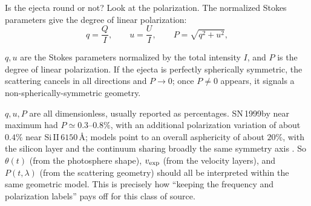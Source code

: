 Is the ejecta round or not? Look at the polarization. The normalized Stokes parameters give the degree of linear polarization:
\begin{equation}
  q=\frac{Q}{I},\qquad
  u=\frac{U}{I},\qquad
  P=\sqrt{q^2+u^2},
  \label{eq:e20-stokes-polarization}
\end{equation}
\begin{formulaexplain}
\(q,u\) are the Stokes parameters normalized by the total intensity \(I\), and \(P\) is the degree of linear polarization. If the ejecta is perfectly spherically symmetric, the scattering cancels in all directions and \(P\to0\); once \(P\neq0\) appears, it signals a non-spherically-symmetric geometry.
\end{formulaexplain}
\(q,u,P\) are all dimensionless, usually reported as percentages. SN\,1999by near maximum had \(P\simeq0.3\text{--}0.8\%\), with an additional polarization variation of about \(0.4\%\) near Si\,II\,\(6150\,\text{\AA}\); models point to an overall asphericity of about \(20\%\), with the silicon layer and the continuum sharing broadly the same symmetry axis \citep{2001ApJ...556..302H}. So \(\theta(t)\) (from the photosphere shape), \(v_{\rm exp}\) (from the velocity layers), and \(P(t,\lambda)\) (from the scattering geometry) should all be interpreted within the same geometric model. This is precisely how ``keeping the frequency and polarization labels'' pays off for this class of source.

